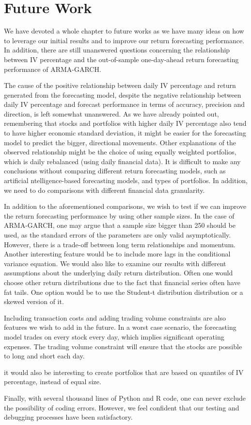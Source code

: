 \chapter{Future Work} \label{FutureWork}
\label{FW}
We have devoted a whole chapter to future works as we have many ideas on how to leverage our initial results and to improve our return forecasting performance. In addition, there are still unanswered questions concerning the relationship between IV percentage and the out-of-sample one-day-ahead return forecasting performance of ARMA-GARCH.

The cause of the positive relationship between daily IV percentage and return generated from the forecasting model, despite the negative relationship between daily IV percentage and forecast performance in terms of accuracy, precision and direction, is left somewhat unanswered. As we have already pointed out, remembering that stocks and portfolios with higher daily IV percentage also tend to have higher economic standard deviation, it might be easier for the forecasting model to predict the bigger, directional movements. Other explanations of the observed relationship might be the choice of using equally weighted portfolios, which is daily rebalanced (using daily financial data). It is difficult to make any conclusions without comparing different return forecasting models, such as artificial ntelligence-based forecasting models, and types of portfolios. In addition, we need to do comparisons with different financial data granularity. 

In addition to the aforementioned comparisons, we wish to test if we can improve the return forecasting performance by using other sample sizes. In the case of ARMA-GARCH, one may argue that a sample size bigger than 250 should be used, as the standard errors of the parameters are only valid asymptotically. However, there is a trade-off between long term relationships and momentum. Another interesting feature would be to include more lags in the conditional variance equation. We would also like to examine our results with different assumptions about the underlying daily return distribution. Often one would choose other return distributions due to the fact that financial series often have fat tails. One option would be to use the Student-t distribution distribution or a skewed version of it.

Including transaction costs and adding trading volume constraints are also features we wish to add in the future. In a worst case scenario, the forecasting model trades on every stock every day, which implies significant operating expenses. The trading volume constraint will ensure that the stocks are possible to long and short each day. 

it would also be interesting to create portfolios that are based on quantiles of IV percentage, instead of equal size. 

Finally, with several thousand lines of Python and R code, one can never exclude the possibility of coding errors. However, we feel confident that our testing and debugging processes have been satisfactory. 